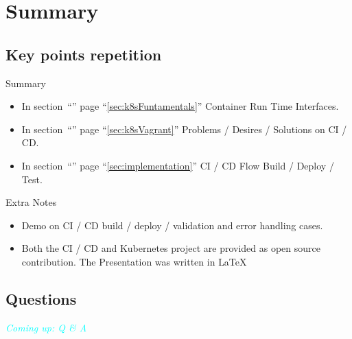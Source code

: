 \section{Summary}
\subsection{Key points repetition}

\begin{frame}
	\begin{exampleblock}{Summary}
		\begin{itemize}[<+->]
			\item In section~``'' page ``\ref{sec:k8sFuntamentals}'' Container Run Time Interfaces.
			\item In section~``'' page ``\ref{sec:k8sVagrant}'' Problems / Desires / Solutions on CI / CD.
			\item In section~``'' page ``\ref{sec:implementation}'' CI / CD Flow Build / Deploy / Test. \pause
		\end{itemize}
	\end{exampleblock}
	\begin{exampleblock}{Extra Notes}
		\begin{itemize}[<+->]
			\item Demo on CI / CD build / deploy / validation and error handling cases.
			\item Both the CI / CD and Kubernetes project are provided as open source contribution. The Presentation was written in \alert{\LaTeX}
		\end{itemize}
	\end{exampleblock}
\end{frame}

\subsection*{Questions}
\begin{frame}
	\begin{center}
		\Huge \textcolor{cyan}{\emph{Coming up: Q \& A}}
	\end{center}
\end{frame}